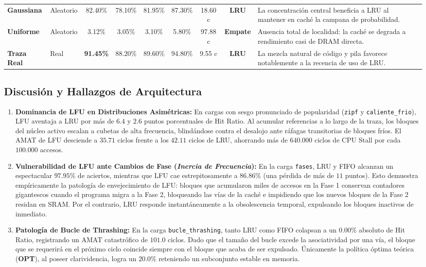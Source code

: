 \documentclass[11pt,letterpaper]{article}
\begin{document}
\begin{table}[htbp]
{\begin{tabular}{llccccccp{4.8cm}}
\textbf{Gaussiana} & Aleatorio & 82.40\% & 78.10\% & 81.95\% & 87.30\% & 18.60 c & \color{UCBlue}\textbf{LRU} & La concentración central beneficia a LRU al mantener en caché la campana de probabilidad. \\
\textbf{Uniforme} & Aleatorio & 3.12\% & 3.05\% & 3.10\% & 5.80\% & 97.88 c & \textbf{Empate} & Ausencia total de localidad: la caché se degrada a rendimiento casi de DRAM directa. \\
\textbf{Traza Real} & Real & \textbf{91.45\%} & 88.20\% & 89.60\% & 94.80\% & 9.55 c & \color{UCBlue}\textbf{LRU} & La mezcla natural de código y pila favorece notablemente a la recencia de uso de LRU. \\
\bottomrule
\end{tabular}%
}
\end{table}

\subsection{Discusión y Hallazgos de Arquitectura}
\begin{enumerate}
    \item \textbf{Dominancia de LFU en Distribuciones Asimétricas:} En cargas con sesgo pronunciado de popularidad (\texttt{zipf} y \texttt{caliente\_frio}), LFU aventaja a LRU por más de $6.4$ y $2.6$ puntos porcentuales de Hit Ratio. Al acumular referencias a lo largo de la traza, los bloques del núcleo activo escalan a cubetas de alta frecuencia, blindándose contra el desalojo ante ráfagas transitorias de bloques fríos. El AMAT de LFU desciende a $35.71$ ciclos frente a los $42.11$ ciclos de LRU, ahorrando más de $640.000$ ciclos de CPU Stall por cada $100.000$ accesos.
    \item \textbf{Vulnerabilidad de LFU ante Cambios de Fase (\textit{Inercia de Frecuencia}):} En la carga \texttt{fases}, LRU y FIFO alcanzan un espectacular $97.95\%$ de aciertos, mientras que LFU cae estrepitosamente a $86.86\%$ (una pérdida de más de $11$ puntos). Esto demuestra empíricamente la patología de envejecimiento de LFU: bloques que acumularon miles de accesos en la Fase 1 conservan contadores gigantescos cuando el programa migra a la Fase 2, bloqueando las vías de la caché e impidiendo que los nuevos bloques de la Fase 2 residan en SRAM. Por el contrario, LRU responde instantáneamente a la obsolescencia temporal, expulsando los bloques inactivos de inmediato.
    \item \textbf{Patología de Bucle de Thrashing:} En la carga \texttt{bucle\_thrashing}, tanto LRU como FIFO colapsan a un $0.00\%$ absoluto de Hit Ratio, registrando un AMAT catastrófico de $101.0$ ciclos. Dado que el tamaño del bucle excede la asociatividad por una vía, el bloque que se requerirá en el próximo ciclo coincide siempre con el bloque que acaba de ser expulsado. Únicamente la política óptima teórica (\textbf{OPT}), al poseer clarividencia, logra un $20.0\%$ reteniendo un subconjunto estable en memoria.
\end{enumerate}
\end{document}
